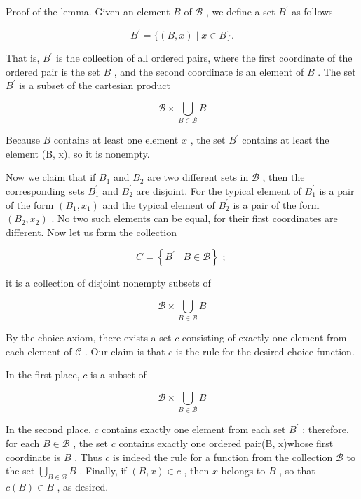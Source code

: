Proof of the lemma. Given an element \(B\) of \(\mathcal{B}\) , we define a set \({B}^{\prime }\) as follows

\[
{B}^{\prime } = \{ \left( {B,x}\right)  \mid  x \in  B\} .
\]

That is, \({B}^{\prime }\) is the collection of all ordered pairs, where the first coordinate of the ordered pair is the set \(B\) , and the second coordinate is an element of \(B\) . The set \({B}^{\prime }\) is a subset of the cartesian product

\[
\mathcal{B} \times  \mathop{\bigcup }\limits_{{B \in  \mathcal{B}}}B
\]

Because \(B\) contains at least one element \(x\) , the set \({B}^{\prime }\) contains at least the element (B, x), so it is nonempty.

Now we claim that if \({B}_{1}\) and \({B}_{2}\) are two different sets in \(\mathcal{B}\) , then the corresponding sets \({B}_{1}^{\prime }\) and \({B}_{2}^{\prime }\) are disjoint. For the typical element of \({B}_{1}^{\prime }\) is a pair of the form \(\left( {{B}_{1},{x}_{1}}\right)\) and the typical element of \({B}_{2}^{\prime }\) is a pair of the form \(\left( {{B}_{2},{x}_{2}}\right)\) . No two such elements can be equal, for their first coordinates are different. Now let us form the collection

\[
C = \left\{  {{B}^{\prime } \mid  B \in  \mathcal{B}}\right\}  \text{ ; }
\]

it is a collection of disjoint nonempty subsets of

\[
\mathcal{B} \times  \mathop{\bigcup }\limits_{{B \in  \mathcal{B}}}B
\]

By the choice axiom, there exists a set \(c\) consisting of exactly one element from each element of \(\mathcal{C}\) . Our claim is that \(c\) is the rule for the desired choice function.

In the first place, \(c\) is a subset of

\[
\mathcal{B} \times  \mathop{\bigcup }\limits_{{B \in  \mathcal{B}}}B
\]

In the second place, \(c\) contains exactly one element from each set \({B}^{\prime }\) ; therefore, for each \(B \in  \mathcal{B}\) , the set \(c\) contains exactly one ordered pair(B, x)whose first coordinate is \(B\) . Thus \(c\) is indeed the rule for a function from the collection \(\mathcal{B}\) to the set \(\mathop{\bigcup }\limits_{{B \in  \mathcal{B}}}B\) . Finally, if \(\left( {B,x}\right)  \in  c\) , then \(x\) belongs to \(B\) , so that \(c\left( B\right)  \in  B\) , as desired.

